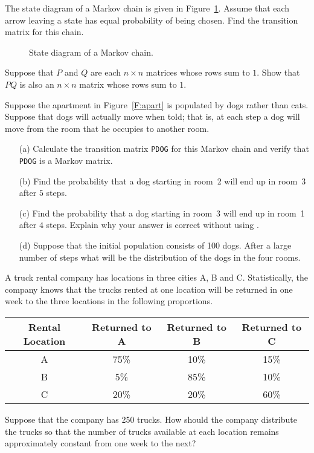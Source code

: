 \begin{exercise} \label{c4.10.3}
The state diagram of a Markov chain is given in Figure~\ref{F:Mchain}.
Assume that each arrow leaving a state has equal probability of being chosen.
Find the transition matrix for this chain.
\end{exercise}
\begin{figure}[htb]
        \centerline{%
        }
        \caption{State diagram of a Markov chain.}
        \label{F:Mchain}
\end{figure}


\begin{exercise} \label{c4.10.4}
Suppose that $P$ and $Q$ are each $n\times n$ matrices whose rows sum to $1$.
Show that $PQ$ is also an $n\times n$ matrix whose rows sum to $1$.
\end{exercise}



\CEXER

\begin{exercise} \label{c4.10.5}
Suppose the apartment in Figure~\ref{F:apart} is populated by dogs rather than
cats.  Suppose that dogs will actually move when told; that is, at each step
a dog will move from the room that he occupies to another room.
\begin{itemize}
\item[(a)]  Calculate the transition matrix {\tt PDOG} for this Markov chain
and verify that {\tt PDOG} is a Markov matrix.
\item[(b)]  Find the probability that a dog starting in room~2 will end up in
room~3 after $5$ steps.
\item[(c)]  Find the probability that a dog starting in room~3 will end up in
room~1 after $4$ steps.  Explain why your answer is correct without using
\Matlabp.
\item[(d)]  Suppose that the initial population consists of 100 dogs.  After
a large number of steps what will be the distribution of the dogs in the four
rooms.
\end{itemize}
\end{exercise}

\begin{exercise} \label{c4.10.6}
A truck rental company has locations in three cities A, B and C.
Statistically, the company knows that the trucks rented at one location will
be returned in one week to the three locations in the following proportions.
\begin{center}
\begin{tabular}{|c||c|c|c|}
\hline
Rental Location &  Returned to A & Returned to B & Returned to C\\
\hline
A  & 75\% & 10\%  & 15\% \\
\hline
B & 5\% & 85\% & 10\% \\
\hline
C & 20\% & 20\% & 60\%\\
\hline
\end{tabular}
\end{center}
Suppose that the company has 250 trucks.  How should the company distribute
the trucks so that the number of trucks available at each location remains
approximately constant from one week to the next?
\end{exercise}

